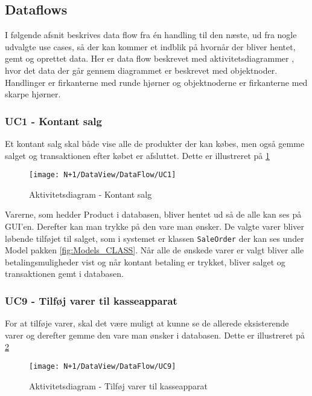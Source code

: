 \subsection{Dataflows}
I følgende afsnit beskrives data flow fra én handling til den næste, ud fra nogle udvalgte use cases, så der kan kommer et indblik på hvornår der bliver hentet, gemt og oprettet data. Her er data flow beskrevet med aktivitetsdiagrammer \cite{gh:UMLActivityDiagrams}, hvor det data der går gennem diagrammet er beskrevet med objektnoder. Handlinger er firkanterne med runde hjørner og objektnoderne er firkanterne med skarpe hjørner.   

\subsubsection{UC1 - Kontant salg}
Et kontant salg skal både vise alle de produkter der kan købes, men også gemme salget og transaktionen efter købet er afsluttet. Dette er illustreret på \ref{fig:AD_UC1}

\begin{figure}[H]
    \centering
    \texttt{[image: N+1/DataView/DataFlow/UC1]}
    \caption{Aktivitetsdiagram - Kontant salg}
    \label{fig:AD_UC1}
\end{figure}    

Varerne, som hedder Product i databasen, bliver hentet ud så de alle kan ses på GUI'en. Derefter kan man trykke på den vare man ønsker. De valgte varer bliver løbende tilføjet til salget, som i systemet er klassen \texttt{SaleOrder} der kan ses under Model pakken \ref{fig:Models_CLASS}. Når alle de ønskede varer er valgt bliver alle betalingsmuligheder vist og når kontant betaling er trykket, bliver salget og transaktionen gemt i databasen. 

\subsubsection{UC9 - Tilføj varer til kasseapparat}
For at tilføje varer, skal det være muligt at kunne se de allerede eksisterende varer og derefter gemme den vare man ønsker i databasen. Dette er illustreret på \ref{fig:AD_UC9}

\begin{figure}[H]
    \centering
    \texttt{[image: N+1/DataView/DataFlow/UC9]}
    \caption{Aktivitetsdiagram - Tilføj varer til kasseapparat}
    \label{fig:AD_UC9}
\end{figure}    

